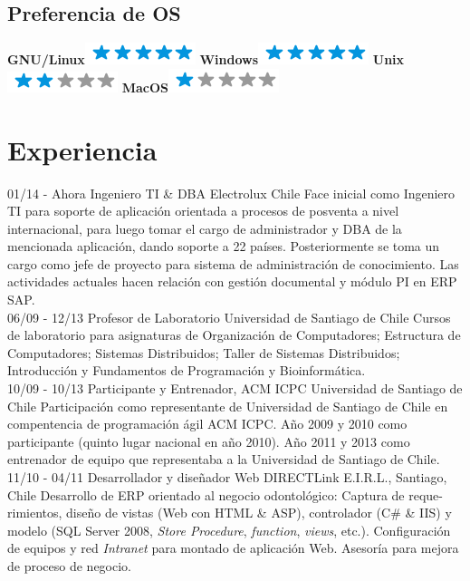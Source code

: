 \documentclass[]{friggeri-cv}
\begin{document}
\begin{aside}
  \section{Preferencia de OS}
    \textbf{GNU/Linux}\includegraphics[scale=0.40]{img/5stars.png}
    \textbf{Windows}\includegraphics[scale=0.40]{img/5stars.png}
    \textbf{Unix}\includegraphics[scale=0.40]{img/2stars.png}
    \textbf{MacOS}\includegraphics[scale=0.40]{img/1stars.png}
\end{aside}

\section{Experiencia}
\begin{entrylist}
    \entry
    {01/14 - Ahora}
    {Ingeniero TI \& DBA}
    {Electrolux Chile}
    {Face inicial como Ingeniero TI para soporte de aplicaci{\'o}n orientada a procesos de posventa a nivel internacional, para luego tomar el cargo de administrador y DBA de la mencionada aplicaci{\'o}n, dando soporte a 22 pa{\'i}ses. Posteriormente se toma un cargo como jefe de proyecto para sistema de administraci{\'o}n de conocimiento. Las actividades actuales hacen relaci{\'o}n con gesti{\'o}n documental y m{\'o}dulo PI en ERP SAP.\\}
    \entry
    {06/09 - 12/13}
    {Profesor de Laboratorio}
    {Universidad de Santiago de Chile}
    {Cursos de laboratorio para asignaturas de Organizaci{\'o}n de Computadores; Estructura de Computadores; Sistemas Distribuidos; Taller de Sistemas Distribuidos; Introducci{\'o}n y Fundamentos de Programaci{\'o}n y Bioinform{\'a}tica.\\}    
    \entry
    {10/09 - 10/13}
    {Participante y Entrenador, ACM ICPC}
    {Universidad de Santiago de Chile}
    {Participaci{\'o}n como representante de Universidad de Santiago de Chile en compentencia de programaci{\'o}n {\'a}gil ACM ICPC. A{\~n}o 2009 y 2010 como participante (quinto lugar nacional en a{\~n}o 2010). A{\~n}o 2011 y 2013 como entrenador de equipo que representaba a la Universidad de Santiago de Chile.\\}
    \entry
    {11/10 - 04/11}
    {Desarrollador y dise{\~n}ador Web}
    {DIRECTLink E.I.R.L., Santiago, Chile}
    {Desarrollo de ERP orientado al negocio odontol{\'o}gico: Captura de reque-rimientos, dise{\~n}o de vistas (Web con HTML \& ASP), controlador (C\# \& IIS) y modelo (SQL Server 2008, \textit{Store Procedure}, \textit{function}, \textit{views}, etc.). Configuración de equipos y red \textit{Intranet} para montado de aplicaci{\'o}n Web. Asesor{\'i}a para mejora de proceso de negocio.}
\end{entrylist}
\end{document}
